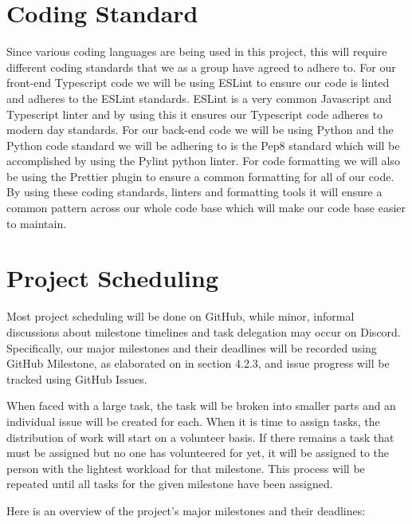 \documentclass{article}
\begin{document}
\section{Coding Standard}

Since various coding languages are being used in this project, this will require different coding standards that we as a group have agreed to adhere to. For our front-end Typescript code we will be using ESLint to ensure our code is linted and adheres to the ESLint standards. ESLint is a very common Javascript and Typescript linter and by using this it ensures our Typescript code adheres to modern day standards. For our back-end code we will be using Python and the Python code standard we will be adhering to is the Pep8 standard which will be accomplished by using the Pylint python linter. For code formatting we will also be using the Prettier plugin to ensure a common formatting for all of our code. By using these coding standards, linters and formatting tools it will ensure a common pattern across our whole code base which will make our code base easier to maintain.

\section{Project Scheduling}

Most project scheduling will be done on GitHub, while minor, informal discussions about milestone timelines and task delegation may occur on Discord. Specifically, our major milestones and their deadlines will be recorded using GitHub Milestone, as elaborated on in section 4.2.3, and issue progress will be tracked using GitHub Issues.

When faced with a large task, the task will be broken into smaller parts and an individual issue will be created for each. When it is time to assign tasks, the distribution of work will start on a volunteer basis. If there remains a task that must be assigned but no one has volunteered for yet, it will be assigned to the person with the lightest workload for that milestone. This process will be repeated until all tasks for the given milestone have been assigned.

Here is an overview of the project's major milestones and their deadlines:
\end{document}
